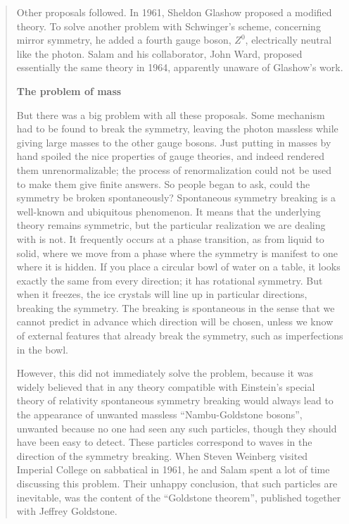 \begin{quote}
Other proposals followed. In 1961, Sheldon Glashow proposed a modified theory. To solve another problem with Schwinger’s scheme, concerning mirror symmetry, he added a fourth gauge boson, $Z^0$, electrically neutral like the photon. Salam and his collaborator, John Ward, proposed essentially the same theory in 1964, apparently unaware of Glashow’s work.

\textbf{The problem of mass}

But there was a big problem with all these proposals. Some mechanism had to be found to break the symmetry, leaving the photon massless while giving large masses to the other gauge bosons. Just putting in masses by hand spoiled the nice properties of gauge theories, and indeed rendered them unrenormalizable; the process of renormalization could not be used to make them give finite answers. So people began to ask, could the symmetry be broken spontaneously? Spontaneous symmetry breaking is a well-known and ubiquitous phenomenon. It means that the underlying theory remains symmetric, but the particular realization we are dealing with is not. It frequently occurs at a phase transition, as from liquid to solid, where we move from a phase where the symmetry is manifest to one where it is hidden. If you place a circular bowl of water on a table, it looks exactly the same from every direction; it has rotational symmetry. But when it freezes, the ice crystals will line up in particular directions, breaking the symmetry. The breaking is spontaneous in the sense that we cannot predict in advance which direction will be chosen, unless we know of external features that already break the symmetry, such as imperfections in the bowl.

However, this did not immediately solve the problem, because it was widely believed that in any theory compatible with Einstein’s special theory of relativity spontaneous symmetry breaking would always lead to the appearance of unwanted massless “Nambu-Goldstone bosons”, unwanted because no one had seen any such particles, though they should have been easy to detect. These particles correspond to waves in the direction of the symmetry breaking. When Steven Weinberg visited Imperial College on sabbatical in 1961, he and Salam spent a lot of time discussing this problem. Their unhappy conclusion, that such particles are inevitable, was the content of the “Goldstone theorem”, published together with Jeffrey Goldstone.


\end{quote}
